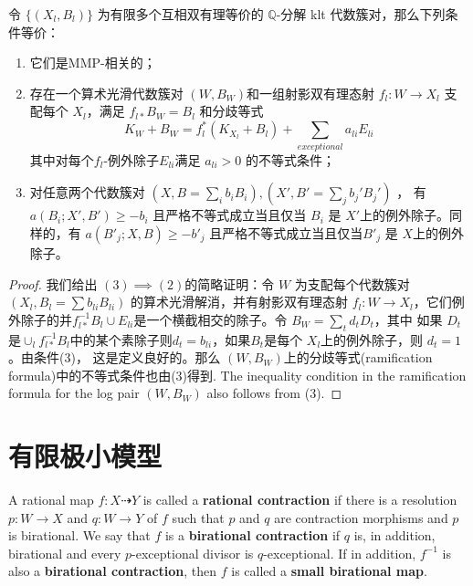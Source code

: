 \begin{lemma}\label{MMP-相关的条件}
	\cite[Proposition 3.4]{brunoLogSarkisovProgram1995}
	令 $ \{(X_l,B_l)\} $ 为有限多个互相双有理等价的 $ \mathbb{Q} $-分解 klt 代数簇对，那么下列条件等价：
	\begin{enumerate}
		\item 它们是MMP-相关的；
		\item 存在一个算术光滑代数簇对 $ (W,B_W) $和一组射影双有理态射  $ f_l:W\to  X_l $ 支配每个 $ X_l $，满足 $ f_{l*}B_W=B_l $ 和分歧等式
		      \[ K_W+B_W=f_l^*(K_{X_l}+B_l)+\sum_{exceptional}{a_{li}E_{li}} \]
		      其中对每个$ f_l $-例外除子$E_{li}$满足 $a_{li}>0$ 的不等式条件；
		\item 对任意两个代数簇对 $ (X,B=\sum_ib_{i }B_i),(X',B'=\sum_{j}b_{j}'B_{j}') $ ， 有  $ a(B_i;X',B')\geqslant -b_i $ 且严格不等式成立当且仅当 $ B_i $ 是 $ X' $上的例外除子。同样的，有 $ a(B'_j;X,B)\geqslant -b'_j $ 且严格不等式成立当且仅当$ B'_j $ 是 $ X $上的例外除子。
	\end{enumerate}
\end{lemma}
\begin{proof}
  我们给出  $(3) \implies (2)$的简略证明：令 $W$ 为支配每个代数簇对 $(X_l,B_l=\sum b_{li}B_{li})$ 的算术光滑解消，并有射影双有理态射 $f_l:W\to X_l$，它们例外除子的并$f_{l*}^{-1}B_l\cup E_{li}$是一个横截相交的除子。令 $B_W=\sum_t d_tD_t $，其中  如果 $D_t$ 是$\cup_l f_{l*}^{-1}B_l$中的某个素除子则$d_t = b_{li}$，如果$B_{t}$是每个 $X_{l}$上的例外除子，则  $d_t=1$。由条件(3)， 这是定义良好的。那么 $(W,B_{W})$上的分歧等式(ramification formula)中的不等式条件也由(3)得到. The inequality condition in the ramification formula for the log pair $(W,B_W)$ also follows from (3).
\end{proof}

\section{有限极小模型}

\begin{definition}
	\cite[\S 2]{haconSarkisovProgram2012} A rational map $f:X\dashrightarrow Y$ is called a \textbf{rational contraction} if there is a resolution $p:W\to X$  and $q:W\to Y$  of $f$  such that $p$  and $q$  are contraction morphisms and $p$  is birational. We say that $f$ is a \textbf{birational contraction} if $q$  is, in addition, birational and every $p$-exceptional divisor is $q$-exceptional. If in addition, $f^{-1}$ is also a \textbf{birational contraction}, then $f$ is called a \textbf{small birational map}.
\end{definition}

